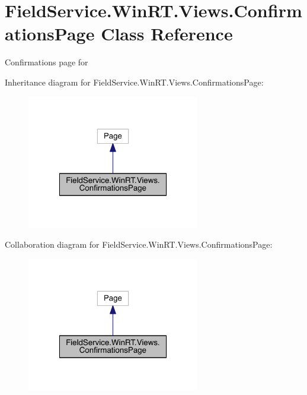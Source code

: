 \hypertarget{class_field_service_1_1_win_r_t_1_1_views_1_1_confirmations_page}{\section{Field\+Service.\+Win\+R\+T.\+Views.\+Confirmations\+Page Class Reference}
\label{class_field_service_1_1_win_r_t_1_1_views_1_1_confirmations_page}
}


Confirmations page for  




Inheritance diagram for Field\+Service.\+Win\+R\+T.\+Views.\+Confirmations\+Page\+:
\nopagebreak
\begin{figure}[H]
\begin{center}
\leavevmode
\includegraphics[width=214pt]{class_field_service_1_1_win_r_t_1_1_views_1_1_confirmations_page__inherit__graph}
\end{center}
\end{figure}


Collaboration diagram for Field\+Service.\+Win\+R\+T.\+Views.\+Confirmations\+Page\+:
\nopagebreak
\begin{figure}[H]
\begin{center}
\leavevmode
\includegraphics[width=214pt]{class_field_service_1_1_win_r_t_1_1_views_1_1_confirmations_page__coll__graph}
\end{center}
\end{figure}
